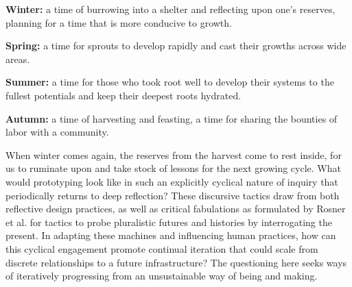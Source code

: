 \textbf{Winter:} a time of burrowing into a shelter and reflecting upon one's reserves, planning for a time that is more conducive to growth.

\textbf{Spring:} a time for sprouts to develop rapidly and cast their growths across wide areas. 

\textbf{Summer:} a time for those who took root well to develop their systems to the fullest potentials and keep their deepest roots hydrated.

\textbf{Autumn:} a time of harvesting and feasting, a time for sharing the bounties of labor with a community.

When winter comes again, the reserves from the harvest come to rest inside, for us to ruminate upon and take stock of lessons for the next growing cycle. What would prototyping look like in such an explicitly cyclical nature of inquiry that periodically returns to deep reflection? 
These discursive tactics draw from both reflective design practices, as well as critical fabulations as formulated by Rosner et al. \cite{sengers_reflective_2005,rosner_critical_2018} for tactics to probe pluralistic futures and histories by interrogating the present. In adapting these machines and influencing human practices, how can this cyclical engagement promote continual iteration that could scale from discrete relationships to a future infrastructure? The questioning here seeks ways of iteratively progressing from an unsustainable way of being and making.

